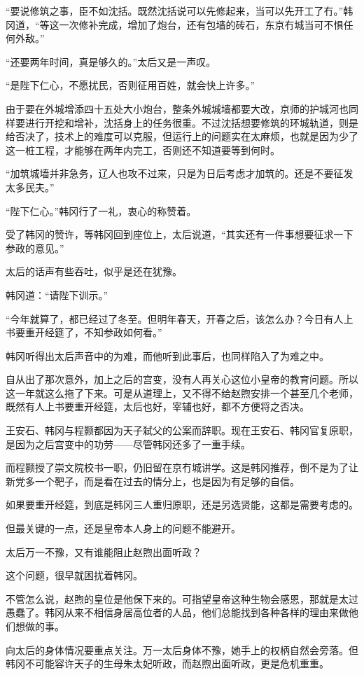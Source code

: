 “要说修筑之事，臣不如沈括。既然沈括说可以先修起来，当可以先开工了冇。”韩冈道，“等这一次修补完成，增加了炮台，还有包墙的砖石，东京冇城当可不惧任何外敌。”

“还要两年时间，真是够久的。”太后又是一声叹。

“是陛下仁心，不愿扰民，否则征用百姓，就会快上许多。”

由于要在外城增添四十五处大小炮台，整条外城城墙都要大改，京师的护城河也同样要进行开挖和增补，沈括身上的任务很重。不过沈括想要修筑的环城轨道，则是给否决了，技术上的难度可以克服，但运行上的问题实在太麻烦，也就是因为少了这一桩工程，才能够在两年内完工，否则还不知道要等到何时。

“加筑城墙并非急务，辽人也攻不过来，只是为日后考虑才加筑的。还是不要征发太多民夫。”

“陛下仁心。”韩冈行了一礼，衷心的称赞着。

受了韩冈的赞许，等韩冈回到座位上，太后说道，“其实还有一件事想要征求一下参政的意见。”

太后的话声有些吞吐，似乎是还在犹豫。

韩冈道：“请陛下训示。”

“今年就算了，都已经过了冬至。但明年春天，开春之后，该怎么办？今日有人上书要重开经筵了，不知参政如何看。”

韩冈听得出太后声音中的为难，而他听到此事后，也同样陷入了为难之中。

自从出了那次意外，加上之后的宫变，没有人再关心这位小皇帝的教育问题。所以这一年就这么拖了下来。可是从道理上，又不得不给赵煦安排一个甚至几个老师，既然有人上书要重开经筵，太后也好，宰辅也好，都不方便将之否决。

王安石、韩冈与程颢都因为天子弑父的公案而辞职。现在王安石、韩冈官复原职，是因为之后宫变中的功劳——尽管韩冈还多了一重手续。

而程颢授了崇文院校书一职，仍旧留在京冇城讲学。这是韩冈推荐，倒不是为了让新党多一个靶子，而是看在过去的情分上，也是因为有足够的自信。

如果要重开经筵，到底是韩冈三人重归原职，还是另选贤能，这都是需要考虑的。

但最关键的一点，还是皇帝本人身上的问题不能避开。

太后万一不豫，又有谁能阻止赵煦出面听政？

这个问题，很早就困扰着韩冈。

不管怎么说，赵煦的皇位是他保下来的。可指望皇帝这种生物会感恩，那就是太过愚蠢了。韩冈从来不相信身居高位者的人品，他们总能找到各种各样的理由来做他们想做的事。

向太后的身体情况要重点关注。万一太后身体不豫，她手上的权柄自然会旁落。但韩冈不可能容许天子的生母朱太妃听政，而赵煦出面听政，更是危机重重。

